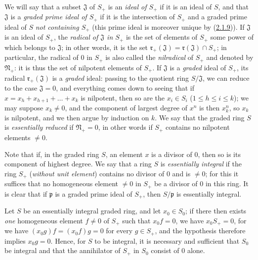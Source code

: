 \begin{env}[2.1.10]
\label{II.2.1.10}
We will say that a subset $\mathfrak{J}$ of $S_+$ is an
\emph{ideal of $S_+$} if it is an ideal of $S$, and that $\mathfrak{J}$ is a
\emph{graded prime ideal of $S_+$} if it is the intersection of $S_+$ and
a graded prime ideal of $S$ \emph{not containing $S_+$} (this prime ideal
is moreover unique by
(\hyperref[II.2.1.9]{2.1.9})). If $\mathfrak{J}$ is an ideal of $S_+$,
the \emph{radical of $\mathfrak{J}$ in $S_+$} is the set of elements of
$S_+$ some power of which belongs to $\mathfrak{J}$; in other words, it is
the set $\mathfrak{r}_+(\mathfrak{J})=\mathfrak{r}(\mathfrak{J})\cap S_+$; in particular, the
radical of $0$ in $S_+$ is also called the \emph{nilradical} of $S_+$ and
denoted by $\mathfrak{N}_+$: it is thus the set of nilpotent elements of
$S_+$. If $\mathfrak{J}$ is a \emph{graded} ideal of $S_+$, its radical
$\mathfrak{r}_+(\mathfrak{J})$ is a \emph{graded} ideal: passing to the quotient ring
$S/\mathfrak{J}$, we can reduce to the case $\mathfrak{J}=0$, and
everything comes down to seeing that if $x=x_h+x_{h+1}+\ldots+x_k$ is
nilpotent, then so are the $x_i\in S_i$ ($1\leq h\leq i\leq k$); we may
suppose $x_k\neq 0$, and the component of largest degree of $x^n$ is then
$x_k^n$, so $x_k$ is nilpotent, and we then argue by induction on $k$. We
say that the graded ring $S$ is \emph{essentially reduced} if
$\mathfrak{N}_+=0$, in other words if $S_+$ contains no nilpotent elements
$\neq 0$.
\end{env}

\begin{env}[2.1.11]
\label{II.2.1.11}
Note that if, in the graded ring $S$, an element $x$ is a divisor of
$0$, then so is its component of highest degree. We say that a ring $S$ is
\emph{essentially integral} if the ring $S_+$
(\emph{without unit element}) contains no divisor of $0$ and is
$\neq 0$; for this it suffices that no homogeneous element $\neq 0$ in
$S_+$ be a divisor of $0$ in this ring. It is clear that if $\mathfrak{p}$
is a graded prime ideal of $S_+$, then $S/\mathfrak{p}$ is essentially
integral.

Let $S$ be an essentially integral graded ring, and let $x_0\in S_0$;
if there then exists \emph{one} homogeneous element $f\neq 0$ of $S_+$ such
that $x_0f=0$, we have $x_0S_+=0$, for we have $(x_0g)f=(x_0f)g=0$ for
every $g\in S_+$, and the hypothesis therefore implies $x_0g=0$. Hence,
for $S$ to be integral, it is necessary and sufficient that $S_0$ be
integral and that the annihilator of $S_+$ in $S_0$ consist of $0$ alone.
\end{env}

